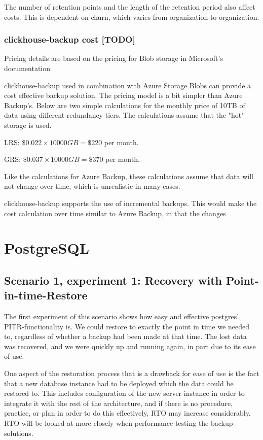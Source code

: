 The number of retention points and the length of the retention period also affect costs.
This is dependent on churn, which varies from organization to organization.

\subsubsection{clickhouse-backup cost [TODO]}

Pricing details are based on the pricing for Blob storage in Microsoft's documentation 
\cite{noauthor_azure_nodate-1} 


clickhouse-backup used in combination with 
Azure Storage Blobs can provide a cost effective backup solution.
The pricing model is a bit simpler than Azure Backup's.
Below are two simple calculations for the monthly price of 10TB of data using different redundancy tiers.
The calculations assume that the "hot" storage is used.

LRS:
$\$0.022 \times 10000GB = \$220$ per month.

GRS:
$\$0.037 \times 10000GB = \$370$ per month.

Like the calculations for Azure Backup, these calculations assume that data will not change over time,
which is unrealistic in many cases.

clickhouse-backup supports the use of incremental backups.
This would make the cost calculation over time similar to Azure Backup,
in that the changes 




\section{PostgreSQL}

\subsection{Scenario 1, experiment 1: Recovery with Point-in-time-Restore}
The first experiment of this scenario shows how easy and effective postgres' PITR-functionality is. We could restore to exactly the point in time we needed to, regardless of whether a backup had been made at that time. The lost data was recovered, and we were quickly up and running again, in part due to its ease of use. 

One aspect of the restoration process that is a drawback for ease of use is the fact that a new database instance had to be deployed which the data could be restored to. This includes configuration of the new server instance in order to integrate it with the rest of the architecture, and if there is no procedure, practice, or plan in order to do this effectively, RTO may increase considerably. RTO will be looked at more closely when performance testing the backup solutions.  

